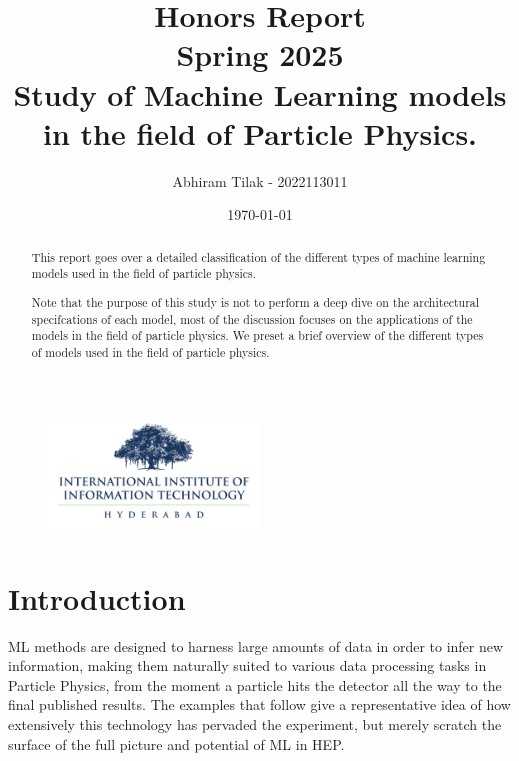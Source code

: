 \documentclass[letterpaper,12pt]{article}
\date{\today}
\newcommand\authormark[1]{\textsuperscript{#1}}
\begin{document}
\begin{spacing}{1.125}

    \title{\Large{Honors Report} \\ \normalsize{Spring 2025} \\ \vspace{1cm} \Huge{Study of Machine Learning models in the field of Particle Physics.
}}
\begin{figure}[H]
    \centering
\includegraphics[width=0.5\textwidth]{iiith_logo.png}
\end{figure}
\vspace{0.5cm}

\vspace{1cm}
\author{Abhiram Tilak - 2022113011}
\address{\authormark{*}International Instituite of Information Technology, Hyderabad}
\vspace{1cm}

\begin{abstract}
This report goes over a detailed classification of the different types of machine learning models used in the field of particle physics. 

Note that the purpose of this study is not to perform a deep dive on the architectural specifcations of each model, most of the discussion focuses on the applications of the models in the field of particle physics. We preset a brief overview of the different types of models used in the field of particle physics.
\end{abstract}

\pagebreak





\tableofcontents
\listoffigures
\listoftables
\lstlistoflistings


\section{Introduction}


ML methods are designed to harness large amounts of data in order to infer new information, making them naturally suited to various data processing tasks in Particle Physics,
from the moment a particle hits the detector all the way to the final published results.
The examples that follow give a representative idea of how extensively this technology has pervaded
the experiment, but merely scratch the surface of the full picture and potential of ML in HEP.


\end{spacing}
\end{document}

